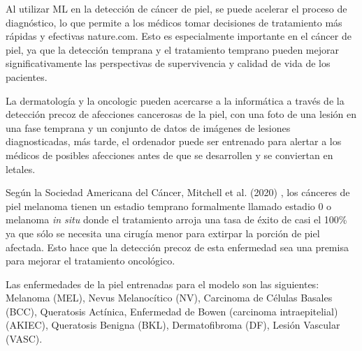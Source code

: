 Al utilizar ML en la detección de cáncer de piel, se puede acelerar el proceso de diagnóstico, lo que permite a los médicos tomar decisiones de 
tratamiento más rápidas y efectivas nature.com. Esto es especialmente importante en el cáncer de piel, ya que la detección temprana y el tratamiento 
temprano pueden mejorar significativamente las perspectivas de supervivencia y calidad de vida de los pacientes.

La dermatología y la oncologic pueden acercarse a la informática a través de la detección precoz de afecciones cancerosas de la piel, con una foto de
una lesión en una fase temprana y un conjunto de datos de imágenes de lesiones diagnosticadas, 
más tarde, el ordenador puede ser entrenado para alertar a los médicos de posibles afecciones antes de que se desarrollen y se conviertan en letales.

Según la Sociedad Americana del Cáncer, Mitchell et al. (2020) \cite{mitchell}, los cánceres de piel melanoma tienen un estadio temprano 
formalmente llamado estadio 0 o melanoma \textit{in situ} donde el tratamiento arroja una tasa de éxito de casi el 100\% ya que sólo se necesita una 
cirugía menor para extirpar la porción de piel afectada. Esto hace que la detección precoz de esta enfermedad sea una premisa para mejorar el 
tratamiento oncológico.

Las enfermedades de la piel entrenadas para el modelo son las siguientes: Melanoma (MEL), Nevus Melanocítico (NV), Carcinoma de Células Basales (BCC), 
Queratosis Actínica, Enfermedad de Bowen (carcinoma intraepitelial) (AKIEC), Queratosis Benigna (BKL), Dermatofibroma (DF), Lesión Vascular (VASC).

